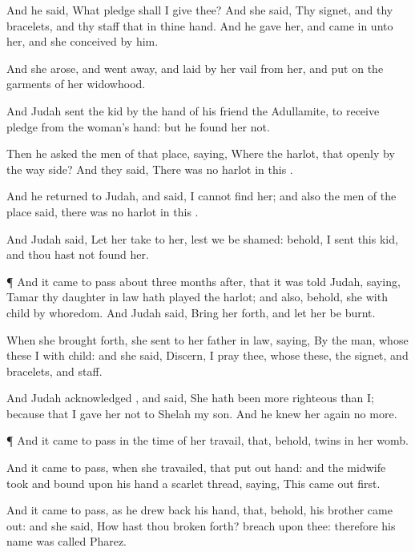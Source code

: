 {And he
said,
What
pledge shall I
give thee? And she
said, Thy
signet, and thy
bracelets, and thy
staff that
{} in thine
hand. And he
gave
{} her, and came
in unto her, and she
conceived by him.

And she
arose, and went
away, and laid
by her
vail from her, and put
on the
garments of her
widowhood.

And
Judah
sent the
kid by the
hand of his
friend the
Adullamite, to
receive
{}
pledge from the
woman’s
hand: but he found
her not.

Then he
asked the
men of that
place,
saying, Where
{} the
harlot, that
{}
openly by the way
side? And they
said, There was no
harlot in
this
{}.

And he
returned to
Judah, and
said, I
cannot
find her; and also the
men of the
place
said,
{} there was no
harlot in this
{}.

And
Judah
said, Let her
take
{} to her, lest we be
shamed: behold, I
sent this
kid, and thou hast not
found her.


\par }{\PP {}¶ And it came to pass about
three
months after, that it was
told
Judah,
saying,
Tamar thy daughter in
law hath played the
harlot; and also, behold, she
{} with
child by
whoredom. And
Judah
said, Bring her
forth, and let her be
burnt.

When she
{} brought
forth, she
sent to her father in
law,
saying, By the
man, whose these
{} I with
child: and she
said,
Discern, I pray thee, whose
{} these, the
signet, and
bracelets, and
staff.

And
Judah
acknowledged
{}, and
said, She hath been more
righteous than I; because that I
gave her not to
Shelah my
son. And he knew
her
again no more.


\par }{\PP {}¶ And it came to pass in the
time of her
travail, that, behold,
twins
{} in her
womb.

And it came to pass, when she
travailed, that
{} put
out
{}
hand: and the
midwife
took and
bound upon his
hand a scarlet
thread,
saying, This came
out
first.

And it came to pass, as he drew
back his
hand, that, behold, his
brother came
out: and she
said, How hast thou broken
forth?
{}
breach
{} upon thee: therefore his
name was
called
Pharez.

}
